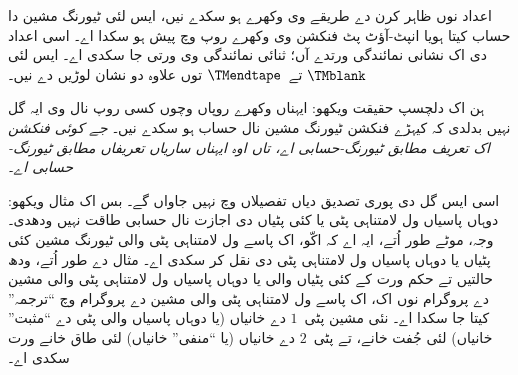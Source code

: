 \documentclass[../../../include/open-logic-section]{subfiles}
\begin{document}
اعداد نوں ظاہر کرن دے
طریقے وی وکھرے ہو سکدے
نیں، ایس لئی ٹیورنگ مشین
دا حساب کیتا ہویا انپٹ-آؤٹ پٹ
فنکشن وی وکھرے روپ وچ
پیش ہو سکدا اے۔ اسی
اعداد دی اک نشانی نمائندگی
ورتدے آں؛ ثنائی نمائندگی
وی ورتی جا سکدی اے۔
ایس لئی $\TMblank$
تے~$\TMendtape$ توں
علاوہ دو نشان لوڑیں دے نیں۔

ہن اک دلچسپ حقیقت ویکھو:
ایہناں وکھرے روپاں وچوں
کسی روپ نال وی ایہ گل نہیں
بدلدی کہ کیہڑے فنکشن
ٹیورنگ مشین نال حساب ہو
سکدے نیں۔ \emph{جے کوئی
فنکشن اک تعریف مطابق
ٹیورنگ-حسابی اے، تاں اوہ
ایہناں ساریاں تعریفاں
مطابق ٹیورنگ-حسابی اے۔}

اسی ایس گل دی پوری
تصدیق دیاں تفصیلاں وچ
نہیں جاواں گے۔ بس اک
مثال ویکھو: دوہاں پاسیاں
ول لامتناہی پٹی یا کئی
پٹیاں دی اجازت نال
حسابی طاقت نہیں ودھدی۔
وجہ، موٹے طور اُتے،
ایہ اے کہ اکّو، اک
پاسے ول لامتناہی پٹی
والی ٹیورنگ مشین کئی
پٹیاں یا دوہاں پاسیاں
ول لامتناہی پٹی دی
نقل کر سکدی اے۔ مثال
دے طور اُتے، ودھ
حالتیں تے حکم ورت کے
کئی پٹیاں والی یا
دوہاں پاسیاں ول
لامتناہی پٹی والی
مشین دے پروگرام نوں
اک، اک پاسے ول
لامتناہی پٹی والی
مشین دے پروگرام وچ
“ترجمہ” کیتا جا
سکدا اے۔ نئی مشین
پٹی~$1$ دے خانیاں
(یا دوہاں پاسیاں
والی پٹی دے “مثبت”
خانیاں) لئی جُفت
خانے، تے پٹی~$2$
دے خانیاں (یا
“منفی” خانیاں)
لئی طاق خانے
ورت سکدی اے۔
\end{document}
